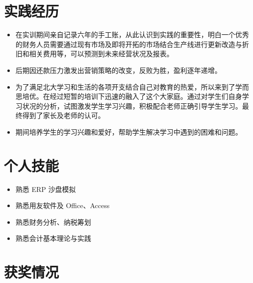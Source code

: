 \documentclass{resume}
\begin{document}
\pagestyle{empty}

\section{实践经历}

\begin{onehalfspacing}
\begin{itemize}
  \item 在实训期间亲自记录六年的手工账，从此认识到实践的重要性，明白一个优秀的财务人员需要通过现有市场及即将开拓的市场结合生产线进行更新改造与折旧和相关费用等，可以预测到未来经营状况及报表。
  \item 后期因还款压力激发出营销策略的改变，反败为胜，盈利逐年递增。
\end{itemize}
\end{onehalfspacing}

\begin{onehalfspacing}
\begin{itemize}
  \item 为了满足北大学习和生活的各项开支结合自己对教育的热爱，所以来到了学而思培优。在经过短暂的培训下迅速的融入了这个大家庭。通过对学生们自身学习状况的分析，试图激发学生学习兴趣，积极配合老师正确引导学生学习。最终得到了家长及老师的认可。
  \item 期间培养学生的学习兴趣和爱好，帮助学生解决学习中遇到的困难和问题。
\end{itemize}
\end{onehalfspacing}

\section{个人技能}
\begin{onehalfspacing}
\begin{itemize}[parsep=0.5ex]
  \item 熟悉 ERP 沙盘模拟
  \item 熟悉用友软件及 Office、Access
  \item 熟悉财务分析、纳税筹划
  \item 熟悉会计基本理论与实践
\end{itemize}
\end{onehalfspacing}

\section{获奖情况}
\end{document}
